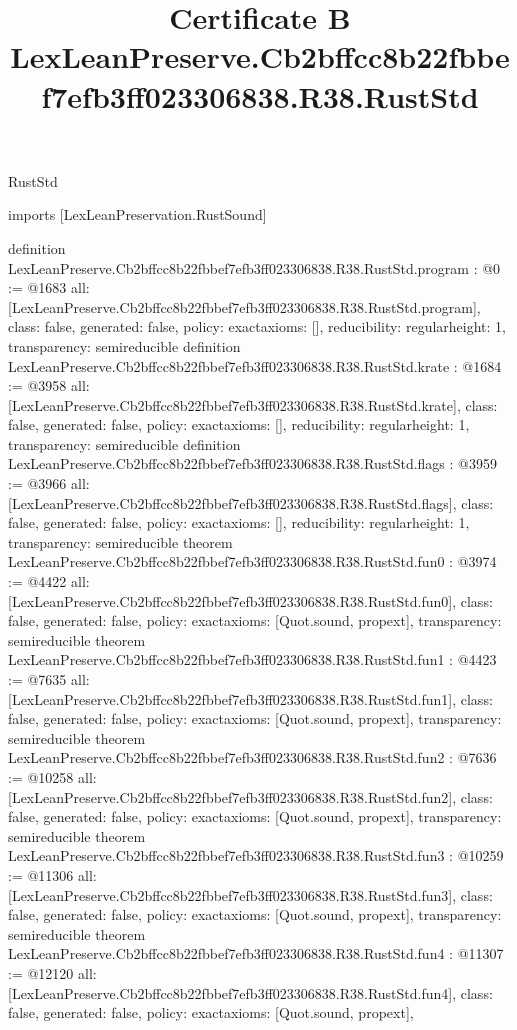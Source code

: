 \begin{lexlean}{RustStd}
\title{Certificate B LexLeanPreserve.Cb2bffcc8b22fbbef7efb3ff023306838.R38.RustStd}
\begin{coremodule}
imports [LexLeanPreservation.RustSound]

definition LexLeanPreserve.Cb2bffcc8b22fbbef7efb3ff023306838.R38.RustStd.program : @0 := @1683 {
  all: [LexLeanPreserve.Cb2bffcc8b22fbbef7efb3ff023306838.R38.RustStd.program],
  class: false,
  generated: false,
  policy: exact{axioms: []},
  reducibility: regular{height: 1},
  transparency: semireducible
}
definition LexLeanPreserve.Cb2bffcc8b22fbbef7efb3ff023306838.R38.RustStd.krate : @1684 := @3958 {
  all: [LexLeanPreserve.Cb2bffcc8b22fbbef7efb3ff023306838.R38.RustStd.krate],
  class: false,
  generated: false,
  policy: exact{axioms: []},
  reducibility: regular{height: 1},
  transparency: semireducible
}
definition LexLeanPreserve.Cb2bffcc8b22fbbef7efb3ff023306838.R38.RustStd.flags : @3959 := @3966 {
  all: [LexLeanPreserve.Cb2bffcc8b22fbbef7efb3ff023306838.R38.RustStd.flags],
  class: false,
  generated: false,
  policy: exact{axioms: []},
  reducibility: regular{height: 1},
  transparency: semireducible
}
theorem LexLeanPreserve.Cb2bffcc8b22fbbef7efb3ff023306838.R38.RustStd.fun0 : @3974 := @4422 {
  all: [LexLeanPreserve.Cb2bffcc8b22fbbef7efb3ff023306838.R38.RustStd.fun0],
  class: false,
  generated: false,
  policy: exact{axioms: [Quot.sound, propext]},
  transparency: semireducible
}
theorem LexLeanPreserve.Cb2bffcc8b22fbbef7efb3ff023306838.R38.RustStd.fun1 : @4423 := @7635 {
  all: [LexLeanPreserve.Cb2bffcc8b22fbbef7efb3ff023306838.R38.RustStd.fun1],
  class: false,
  generated: false,
  policy: exact{axioms: [Quot.sound, propext]},
  transparency: semireducible
}
theorem LexLeanPreserve.Cb2bffcc8b22fbbef7efb3ff023306838.R38.RustStd.fun2 : @7636 := @10258 {
  all: [LexLeanPreserve.Cb2bffcc8b22fbbef7efb3ff023306838.R38.RustStd.fun2],
  class: false,
  generated: false,
  policy: exact{axioms: [Quot.sound, propext]},
  transparency: semireducible
}
theorem LexLeanPreserve.Cb2bffcc8b22fbbef7efb3ff023306838.R38.RustStd.fun3 : @10259 := @11306 {
  all: [LexLeanPreserve.Cb2bffcc8b22fbbef7efb3ff023306838.R38.RustStd.fun3],
  class: false,
  generated: false,
  policy: exact{axioms: [Quot.sound, propext]},
  transparency: semireducible
}
theorem LexLeanPreserve.Cb2bffcc8b22fbbef7efb3ff023306838.R38.RustStd.fun4 : @11307 := @12120 {
  all: [LexLeanPreserve.Cb2bffcc8b22fbbef7efb3ff023306838.R38.RustStd.fun4],
  class: false,
  generated: false,
  policy: exact{axioms: [Quot.sound, propext]},
}
\end{coremodule}
\end{lexlean}
